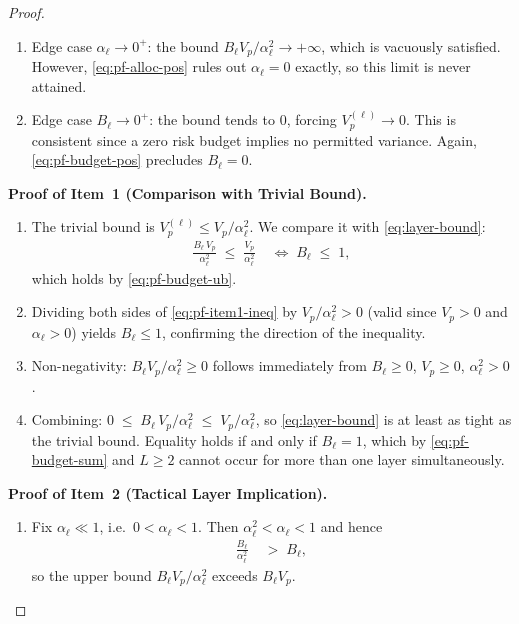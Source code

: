 \documentclass[12pt,openany]{book}
\numberwithin{equation}{chapter}
\theoremstyle{plain}
\theoremstyle{definition}
\theoremstyle{remark}
\begin{document}
\begin{proof}
\begin{enumerate}
  \item Edge case $\alpha_\ell \to 0^+$: the bound
        $B_\ell V_p / \alpha_\ell^2 \to +\infty$, which is
        vacuously satisfied.  However, \eqref{eq:pf-alloc-pos}
        rules out $\alpha_\ell = 0$ exactly, so this limit is
        never attained.

  \item Edge case $B_\ell \to 0^+$: the bound tends to $0$,
        forcing $V_p^{(\ell)} \to 0$.  This is consistent since
        a zero risk budget implies no permitted variance.
        Again, \eqref{eq:pf-budget-pos} precludes $B_\ell = 0$.
\end{enumerate}

\medskip
\noindent\textbf{Proof of Item~1 (Comparison with Trivial Bound).}
\begin{enumerate}
  \item The trivial bound is $V_p^{(\ell)} \leq V_p /
        \alpha_\ell^2$.  We compare it with \eqref{eq:layer-bound}:
        \begin{align}
          \frac{B_\ell\,V_p}{\alpha_\ell^2}
          \;\leq\;
          \frac{V_p}{\alpha_\ell^2}
          &\;\iff\;
          B_\ell \;\leq\; 1,
          \label{eq:pf-item1-ineq}
        \end{align}
        which holds by \eqref{eq:pf-budget-ub}.

  \item Dividing both sides of \eqref{eq:pf-item1-ineq} by
        $V_p / \alpha_\ell^2 > 0$ (valid since $V_p > 0$ and
        $\alpha_\ell > 0$) yields $B_\ell \leq 1$, confirming
        the direction of the inequality.

  \item Non-negativity: $B_\ell V_p / \alpha_\ell^2 \geq 0$
        follows immediately from $B_\ell \geq 0$, $V_p \geq 0$,
        $\alpha_\ell^2 > 0$.

  \item Combining: $0 \;\leq\; B_\ell\,V_p/\alpha_\ell^2
        \;\leq\; V_p/\alpha_\ell^2$, so \eqref{eq:layer-bound}
        is at least as tight as the trivial bound.
        Equality holds if and only if $B_\ell = 1$, which by
        \eqref{eq:pf-budget-sum} and $L \geq 2$ cannot occur
        for more than one layer simultaneously.
\end{enumerate}

\medskip
\noindent\textbf{Proof of Item~2 (Tactical Layer Implication).}
\begin{enumerate}
  \item Fix $\alpha_\ell \ll 1$, i.e.\ $0 < \alpha_\ell < 1$.
        Then $\alpha_\ell^2 < \alpha_\ell < 1$ and hence
        \begin{align}
          \frac{B_\ell}{\alpha_\ell^2}
          \;&>\; B_\ell,
          \label{eq:pf-item2-ratio}
        \end{align}
        so the upper bound $B_\ell V_p / \alpha_\ell^2$ exceeds
        $B_\ell V_p$.


\end{enumerate}
\end{proof}
\end{document}

